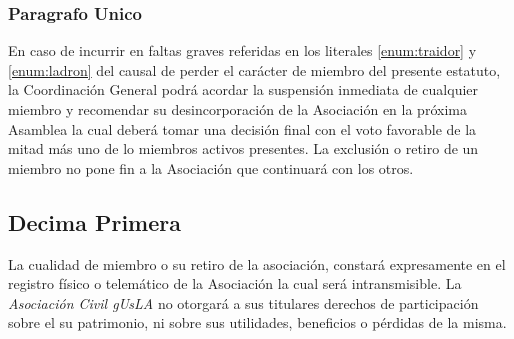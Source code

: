         \subsubsection{Paragrafo Unico}
          En caso de incurrir en faltas graves referidas en los literales
          \ref{enum:traidor} y \ref{enum:ladron} del causal de perder el
          car\'acter de miembro del presente estatuto, la Coordinaci\'on General
          podr\'a acordar la suspensi\'on inmediata de cualquier miembro y
          recomendar su desincorporaci\'on de la Asociaci\'on en la pr\'oxima
          Asamblea la cual deber\'a tomar una decisi\'on final con el voto
          favorable de la mitad m\'as uno de lo miembros activos presentes. La
          exclusi\'on o retiro de un miembro no pone fin a la Asociaci\'on que
          continuar\'a con los otros.

      \subsection{Decima Primera}

        La cualidad de miembro o su retiro de la asociaci\'on, constar\'a
        expresamente en el registro f\'isico o telem\'atico de la Asociaci\'on
        la cual ser\'a intransmisible. La \emph{Asociaci\'on Civil gUsLA}
        no otorgar\'a a sus titulares derechos de participaci\'on
        sobre el su patrimonio, ni sobre sus utilidades, beneficios o p\'erdidas
        de la misma. 
